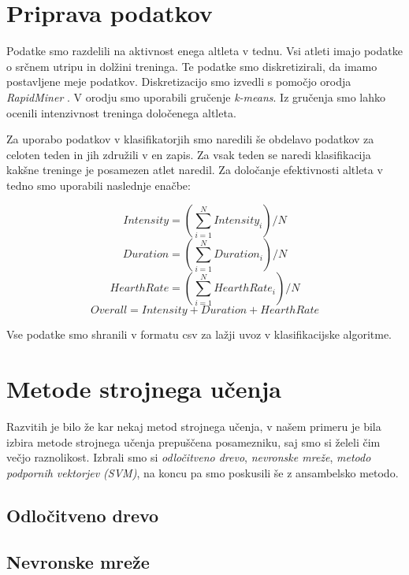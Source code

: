 \documentclass{acm_proc_article-sp}
\begin{document}
\section{Priprava podatkov}
Podatke smo razdelili na aktivnost enega altleta v tednu.
Vsi atleti imajo podatke o srčnem utripu in dolžini treninga.
Te podatke smo diskretizirali, da imamo postavljene meje podatkov.
Diskretizacijo smo izvedli s pomočjo orodja \textit{RapidMiner} \cite{rapidminer}.
V orodju smo uporabili gručenje \textit{k-means}. Iz gručenja smo lahko ocenili intenzivnost treninga določenega altleta.

Za uporabo podatkov v klasifikatorjih smo naredili še obdelavo podatkov za celoten teden in jih združili v en zapis.
Za vsak teden se naredi klasifikacija kakšne treninge je posamezen atlet naredil.
Za določanje efektivnosti altleta v tedno smo uporabili naslednje enačbe: 

\begin{equation}
Intensity = (\sum_{i=1}^{N} Intensity_i) / N
\end{equation}
\begin{equation}
Duration = (\sum_{i=1}^{N} Duration_i) / N
\end{equation}
\begin{equation}
HearthRate = (\sum_{i=1}^{N} HearthRate_i) / N
\end{equation}
\begin{equation} \label{eq:overall}
Overall = Intensity + Duration + HearthRate
\end{equation}

Vse podatke smo shranili v formatu csv za lažji uvoz v klasifikacijske algoritme.

\section{Metode strojnega učenja}
Razvitih je bilo že kar nekaj metod strojnega učenja, v našem primeru je bila izbira metode strojnega učenja prepuščena posamezniku, saj smo si želeli čim večjo raznolikost. Izbrali smo si \textit{odločitveno drevo}, \textit{nevronske mreže}, \textit{metodo podpornih vektorjev (SVM)}, na koncu pa smo poskusili še z ansambelsko metodo.

\subsection{Odločitveno drevo}


\subsection{Nevronske mreže}
\end{document}
